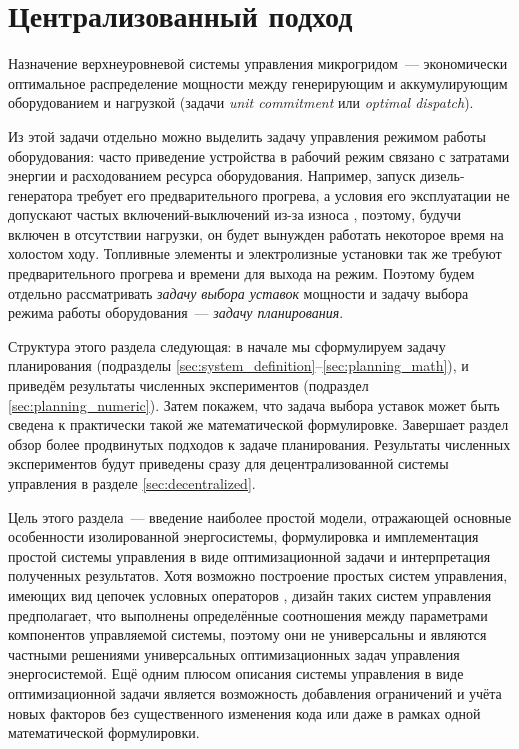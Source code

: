 \section{Централизованный подход}
Назначение верхнеуровневой системы управления микрогридом~--- экономически оптимальное распределение мощности между генерирующим и аккумулирующим оборудованием и нагрузкой (задачи \textit{unit commitment} или \textit{optimal dispatch}).

Из этой задачи отдельно можно выделить задачу управления режимом работы оборудования: часто приведение устройства в рабочий режим связано с затратами энергии и расходованием ресурса оборудования.
Например, запуск дизель-генератора требует его предварительного прогрева, а условия его эксплуатации не допускают частых включений-выключений из-за износа \cite{bleijs1993wear}, поэтому, будучи включен в отсутствии нагрузки, он будет вынужден работать некоторое время на холостом ходу.
Топливные элементы и электролизные установки так же требуют предварительного прогрева и времени для выхода на режим. 
Поэтому будем отдельно рассматривать \textit{задачу выбора уставок} мощности и задачу выбора режима работы оборудования~--- \textit{задачу планирования}.

Структура этого раздела следующая:
в начале мы сформулируем  задачу планирования (подразделы \ref{sec:system_definition}--\ref{sec:planning_math}),
и приведём результаты численных экспериментов (подраздел \ref{sec:planning_numeric}).
Затем покажем, что задача выбора уставок может быть сведена к практически такой же математической формулировке.
Завершает раздел обзор более продвинутых подходов к задаче планирования.
Результаты численных экспериментов будут приведены сразу для децентрализованной системы управления в разделе \ref{sec:decentralized}.

Цель этого раздела~---  введение наиболее простой модели, отражающей основные особенности изолированной энергосистемы, формулировка и имплементация простой системы управления в виде оптимизационной задачи и интерпретация полученных результатов.
Хотя возможно построение простых систем управления, имеющих вид цепочек условных операторов \cite{Aziz2019}, дизайн таких систем управления предполагает, что выполнены определённые соотношения между параметрами компонентов управляемой системы, поэтому они не универсальны и являются частными решениями универсальных оптимизационных задач управления энергосистемой.
Ещё одним плюсом описания системы управления в виде оптимизационной задачи является возможность добавления ограничений и учёта новых факторов без существенного изменения кода или даже в рамках одной математической формулировки.

